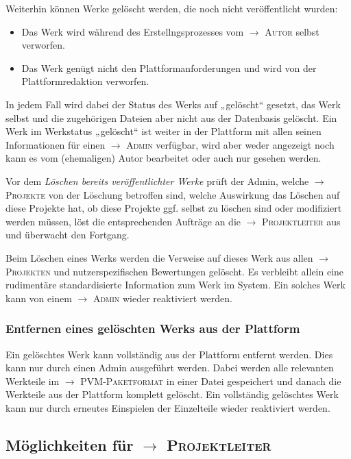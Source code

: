 \documentclass[a4paper,11pt]{article}
\newcommand{\glossar}[1]{{$\to$ \textsc{#1}}}
\begin{document}
Weiterhin können Werke gelöscht werden, die noch nicht veröffentlicht wurden:
\begin{itemize}
\item Das Werk wird während des Erstellngsprozesses vom \glossar{Autor} selbst
  verworfen.
\item Das Werk genügt nicht den Plattformanforderungen und wird von der
  Plattformredaktion verworfen. 
\end{itemize}
In jedem Fall wird dabei der Status des Werks auf „gelöscht“ gesetzt, das Werk
selbst und die zugehörigen Dateien aber nicht aus der Datenbasis gelöscht. Ein
Werk im Werkstatus „gelöscht“ ist weiter in der Plattform mit allen seinen
Informationen für einen \glossar{Admin} verfügbar, wird aber weder angezeigt
noch kann es vom (ehemaligen) Autor bearbeitet oder auch nur gesehen werden.

Vor dem \emph{Löschen bereits veröffentlichter Werke} prüft der Admin, welche
\glossar{Projekte} von der Löschung betroffen sind, welche Auswirkung das
Löschen auf diese Projekte hat, ob diese Projekte ggf. selbst zu löschen sind
oder modifiziert werden müssen, löst die entsprechenden Aufträge an die
\glossar{Projektleiter} aus und überwacht den Fortgang.

Beim Löschen eines Werks werden die Verweise auf dieses Werk aus allen
\glossar{Projekten} und nutzerspezifischen Bewertungen gelöscht.  Es verbleibt
allein eine rudimentäre standardisierte Information zum Werk im System.  Ein
solches Werk kann von einem \glossar{Admin} wieder reaktiviert werden.

\subsubsection{Entfernen eines gelöschten Werks aus der
  Plattform}\label{werk.entfernen} 

Ein gelöschtes Werk kann vollständig aus der Plattform entfernt werden.  Dies
kann nur durch einen Admin ausgeführt werden. Dabei werden alle relevanten
Werkteile im \glossar{PVM-Paketformat} in einer Datei gespeichert und danach
die Werkteile aus der Plattform komplett gelöscht.  Ein vollständig gelöschtes
Werk kann nur durch erneutes Einspielen der Einzelteile wieder reaktiviert
werden.

\subsection{Möglichkeiten für \glossar{Projektleiter}}
\end{document}
